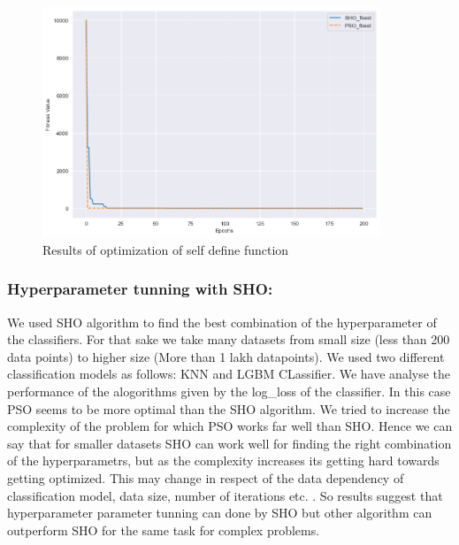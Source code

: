 \documentclass[12pt]{article}
\begin{document}
\begin{figure}
  \centering
      \includegraphics[width=0.9\textwidth]{F5_Self_d_question_fitness.png}
  \caption{Results of optimization of self define function}
\end{figure}

\subsubsection{Hyperparameter tunning with SHO: } We used SHO algorithm to find the best combination of the hyperparameter of the classifiers.
For that sake we take many datasets from small size (less than 200 data points) to higher size (More than 1 lakh datapoints). We used two different classification models as follows:  KNN and LGBM CLassifier. We have analyse the performance of the alogorithms given by the log\_loss of the classifier.
In this case PSO seems to be more optimal than the SHO algorithm. We tried to increase the complexity of the problem for which PSO works far well than SHO. Hence we can say that for smaller datasets SHO can work well for finding the right combination of the hyperparametrs, but as the complexity increases its getting hard towards getting optimized. This may change in respect of the data dependency of classification model, data size, number of iterations etc. .
So results suggest that hyperparameter parameter tunning can done by SHO but other algorithm can outperform SHO for the same task for complex problems. 
\end{document}
